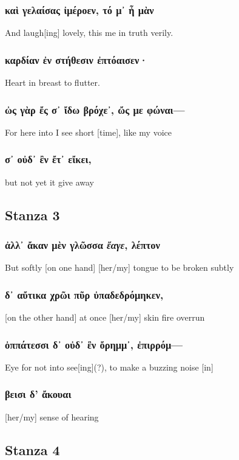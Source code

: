 \subsubsection*{καὶ γελαίσας ἰμέροεν, τό μ᾽ ἦ μὰν}
And laugh[ing] lovely, this me in truth verily.

\subsubsection*{καρδίαν ἐν στήθεσιν ἐπτόαισεν·}
Heart in breast to flutter.

\subsubsection*{ὠς γὰρ ἔς σ᾽ ἴδω βρόχε᾽, ὤς με φώναι---}
For here into I see short [time], like my voice

\subsubsection*{σ᾽ οὐδ᾽ ἒν ἔτ᾽ εἴκει,}

but not yet it give away

\subsection*{Stanza 3}
\subsubsection*{ἀλλ᾽ ἄκαν μὲν γλῶσσα \emph{ἔαγε}, λέπτον}
But softly [on one hand] [her/my] tongue to be broken subtly

\subsubsection*{δ᾽ αὔτικα χρῶι πῦρ ὐπαδεδρόμηκεν,}
[on the other hand] at once [her/my] skin fire overrun

\subsubsection*{ὀππάτεσσι δ᾽ οὐδ᾽ ἒν ὄρημμ᾽, ἐπιρρόμ---}
Eye for not into see[ing](?), to make a buzzing noise [in]

\subsubsection*{βεισι δ' ἄκουαι}
[her/my] sense of hearing

\subsection*{Stanza 4}
